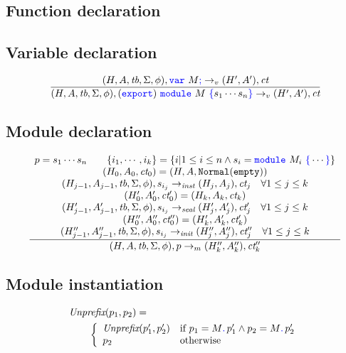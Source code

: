 \documentclass[a4paper]{article}
\newcommand{\code}[1]{\textcolor{blue}{\tt #1}}
\newcommand{\mydot}{.\,}
\newcommand{\Unprefix}{\emph{Unprefix}}
\newcommand{\If}{\mbox{if}}
\newcommand{\Otherwise}{\mbox{otherwise}}
\newcommand{\tb}{\emph{tb}}
\newcommand{\ct}{\emph{ct}}
\newcommand{\Normal}{{\tt{Normal}}}
\newcommand{\Empty}{{\tt{empty}}}
\begin{document}
\subsection{Function declaration}

\subsection{Variable declaration}
\begin{equation*}
\frac{
    (H, A, \tb, \Sigma, \phi), \code{var}\ M\code{;} \rightarrow_v (H', A'), \ct
}{
    (H, A, \tb, \Sigma, \phi), (\code{export})\ \code{module}\ M\ \code{\{} s_1 \cdots s_n \code{\}} \rightarrow_v (H', A'), \ct
}
\end{equation*}

\subsection{Module declaration}

\begin{equation*}
\frac{
    \begin{array}{c}
    p = s_1 \cdots s_n \qquad \{ i_1, \cdots, i_k \} = \{ i | 1 \le i \le n \wedge s_i = \code{module}\ M_i\ \code{\{} \cdots \code{\}} \} \\
    (H_0, A_0, \ct_0) = (H, A, \Normal(\Empty)) \\
    (H_{j-1}, A_{j-1}, \tb, \Sigma, \phi), s_{i_j} \rightarrow_\emph{inst} (H_j, A_j), \ct_j \quad \forall 1 \le j \le k \\
    (H'_0, A'_0, \ct'_0) = (H_k, A_k, \ct_k) \\
    (H'_{j-1}, A'_{j-1}, \tb, \Sigma, \phi), s_{i_j} \rightarrow_\emph{seal} (H'_j, A'_j), \ct'_j \quad \forall 1 \le j \le k \\
    (H''_0, A''_0, \ct''_0) = (H'_k, A'_k, \ct'_k) \\
    (H''_{j-1}, A''_{j-1}, \tb, \Sigma, \phi), s_{i_j} \rightarrow_\emph{init} (H''_j, A''_j), \ct''_j \quad \forall 1 \le j \le k \\
    \end{array}
}{
    (H, A, \tb, \Sigma, \phi), p \rightarrow_m (H''_k, A''_k), \ct''_k
}
\end{equation*}

\subsection{Module instantiation}

\begin{equation*}
\begin{split}
& \Unprefix (p_1, p_2) = \\
&\qquad \left\{\begin{array}{ll}
\Unprefix (p'_1, p'_2) & \If\ p_1 = M\code{\mydot}p'_1 \wedge p_2 = M\code{\mydot}p'_2 \\
p_2 & \Otherwise
\end{array}\right.
\end{split}
\end{equation*}
\end{document}
